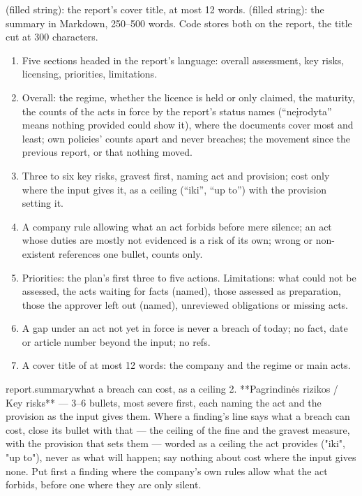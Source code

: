   (filled string): the report's cover title, at most
12 words.  (filled string): the summary in Markdown, 250--500 words. Code stores both on
the report, the title cut at 300 characters.

\begin{enumerate}[itemsep=1pt, topsep=3pt]
  \item Five sections headed in the report's language: overall assessment, key risks,
    licensing, priorities, limitations.
  \item Overall: the regime, whether the licence is held or only claimed, the maturity, the
    counts of the acts in force by the report's status names (\enquote{neįrodyta} means nothing
    provided could show it), where the documents cover most and least; own policies' counts
    apart and never breaches; the movement since the previous report, or that nothing moved.
  \item Three to six key risks, gravest first, naming act and provision; cost only where the
    input gives it, as a ceiling (\enquote{iki}, \enquote{up to}) with the provision setting it.
  \item A company rule allowing what an act forbids before mere silence; an act whose duties
    are mostly not evidenced is a risk of its own; wrong or non-existent references one bullet,
    counts only.
  \item Priorities: the plan's first three to five actions. Limitations: what could not be
    assessed, the acts waiting for facts (named), those assessed as preparation, those the
    approver left out (named), unreviewed obligations or missing acts.
  \item A gap under an act not yet in force is never a breach of today; no fact, date or
    article number beyond the input; no refs.
  \item A cover title of at most 12 words: the company and the regime or main acts.
\end{enumerate}

\par\nopagebreak
\begin{promptexcerpt}{report.summary}{what a breach can cost, as a ceiling}
2. **Pagrindinės rizikos / Key risks** — 3–6 bullets, most severe first, each naming
   the act and the provision as the input gives them. Where a finding's line says
   what a breach can cost, close its bullet with that — the ceiling of the fine and
   the gravest measure, with the provision that sets them — worded as a ceiling the
   act provides ("iki", "up to"), never as what will happen; say nothing about cost
   where the input gives none. Put first a finding where the
   company's own rules allow what the act forbids, before one where they are only
   silent.
\end{promptexcerpt}

